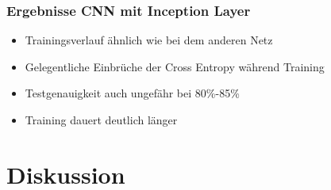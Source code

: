 \documentclass{beamer}
\begin{document}
\begin{frame}
	\frametitle{Ergebnisse CNN mit Inception Layer}
	\begin{figure}
		\label{fig:inception_results}
	\end{figure}
	\begin{itemize}
		\item Trainingsverlauf ähnlich wie bei dem anderen Netz
		\item Gelegentliche Einbrüche der Cross Entropy während Training
		\item Testgenauigkeit auch ungefähr bei 80\%-85\%
		\item Training dauert deutlich länger
	\end{itemize}
\end{frame}

\section{Diskussion}
\end{document}
